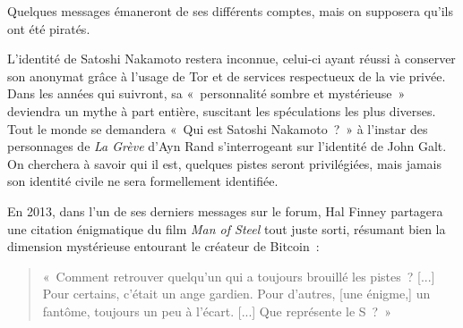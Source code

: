 Quelques messages émaneront de ses différents comptes, mais on supposera qu'ils ont été piratés.


L'identité de Satoshi Nakamoto restera inconnue, celui-ci ayant réussi à conserver son anonymat grâce à l'usage de Tor et de services respectueux de la vie privée. Dans les années qui suivront, sa «~personnalité sombre et mystérieuse~» deviendra un mythe à part entière, suscitant les spéculations les plus diverses. Tout le monde se demandera «~Qui est Satoshi Nakamoto~?~» à l'instar des personnages de \emph{La Grève} d'Ayn Rand s'interrogeant sur l'identité de John Galt. On cherchera à savoir qui il est, quelques pistes seront privilégiées, mais jamais son identité civile ne sera formellement identifiée.

En 2013, dans l'un de ses derniers messages sur le forum, Hal Finney partagera une citation énigmatique du film \emph{Man of Steel} tout juste sorti, résumant bien la dimension mystérieuse entourant le créateur de Bitcoin~:

\begin{quote}
«~Comment retrouver quelqu'un qui a toujours brouillé les pistes~? [...] Pour certains, c'était un ange gardien. Pour d'autres, [une énigme,] un fantôme, toujours un peu à l'écart. [...] Que représente le S~?~» %
\end{quote} 

